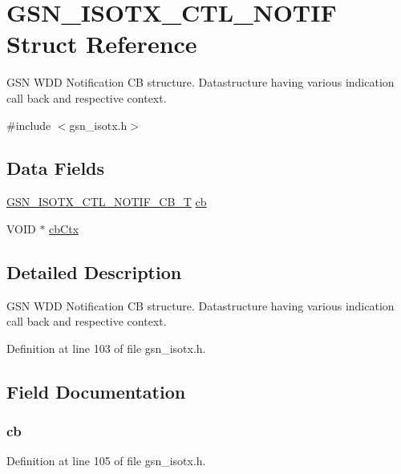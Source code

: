 \hypertarget{a00101}{
\section{GSN\_\-ISOTX\_\-CTL\_\-NOTIF Struct Reference}
\label{a00101}
}


GSN WDD Notification CB structure. Datastructure having various indication call back and respective context.  




{\ttfamily \#include $<$gsn\_\-isotx.h$>$}

\subsection*{Data Fields}
\begin{DoxyCompactItemize}
\item 
\hyperlink{a00520_a5fb480486e6585bd46bfcb3ad503bdd4}{GSN\_\-ISOTX\_\-CTL\_\-NOTIF\_\-CB\_\-T} \hyperlink{a00101_a099bd6634f61ce0761dec53f919a6298}{cb}
\item 
VOID $\ast$ \hyperlink{a00101_abc1717c5357c7dda5c2abef096a06f1f}{cbCtx}
\end{DoxyCompactItemize}


\subsection{Detailed Description}
GSN WDD Notification CB structure. Datastructure having various indication call back and respective context. 

Definition at line 103 of file gsn\_\-isotx.h.



\subsection{Field Documentation}
\hypertarget{a00101_a099bd6634f61ce0761dec53f919a6298}{
\subsubsection[{cb}]{ {\bf cb}}}
\label{a00101_a099bd6634f61ce0761dec53f919a6298}


Definition at line 105 of file gsn\_\-isotx.h.

